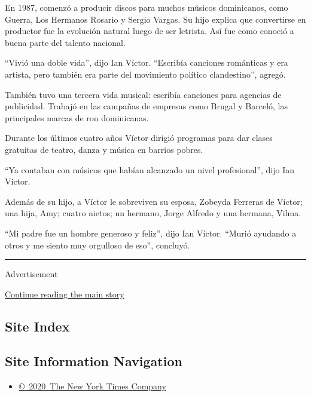 En 1987, comenzó a producir discos para muchos músicos dominicanos, como
Guerra, Los Hermanos Rosario y Sergio Vargas. Su hijo explica que
convertirse en productor fue la evolución natural luego de ser letrista.
Así fue como conoció a buena parte del talento nacional.

``Vivió una doble vida'', dijo Ian Víctor. ``Escribía canciones
románticas y era artista, pero también era parte del movimiento político
clandestino'', agregó.

También tuvo una tercera vida musical: escribía canciones para agencias
de publicidad. Trabajó en las campañas de empresas como Brugal y
Barceló, las principales marcas de ron dominicanas.

Durante los últimos cuatro años Víctor dirigió programas para dar clases
gratuitas de teatro, danza y música en barrios pobres.

``Ya contaban con músicos que habían alcanzado un nivel profesional'',
dijo Ian Víctor.

Además de su hijo, a Víctor le sobreviven su esposa, Zobeyda Ferreras de
Víctor; una hija, Amy; cuatro nietos; un hermano, Jorge Alfredo y una
hermana, Vilma.

``Mi padre fue un hombre generoso y feliz'', dijo Ian Víctor. ``Murió
ayudando a otros y me siento muy orgulloso de eso'', concluyó.

\begin{center}\rule{0.5\linewidth}{\linethickness}\end{center}

Advertisement

\protect\hyperlink{after-bottom}{Continue reading the main story}

\hypertarget{site-index}{%
\subsection{Site Index}\label{site-index}}

\hypertarget{site-information-navigation}{%
\subsection{Site Information
Navigation}\label{site-information-navigation}}

\begin{itemize}
\tightlist
\item
  \href{https://help.nytimes3xbfgragh.onion/hc/en-us/articles/115014792127-Copyright-notice}{©~2020~The
  New York Times Company}
\end{itemize}

